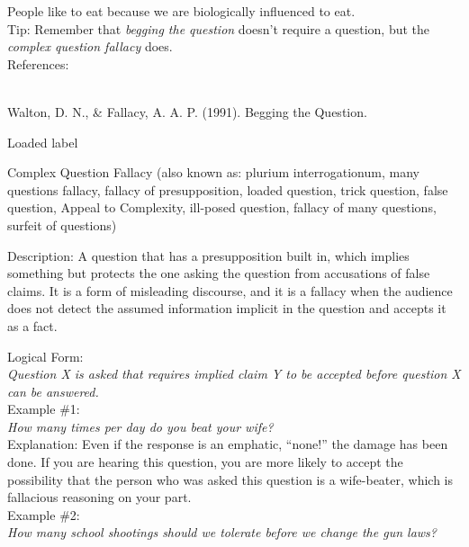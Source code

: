 \documentclass[a4paper,12pt,single,pdftex]{scrartcl}
\begin{document}
{    
      People like to eat because we are biologically influenced to eat.
    \\

    

    
      Tip: Remember that {\em begging the question} doesn’t require a question, but the {\it complex question fallacy} does.
    \\

    References:

    
      
        
      \\

      Walton, D. N., \& Fallacy, A. A. P. (1991). Begging the Question.
    
  }


Loaded label

Complex Question Fallacy
    (also known as: plurium interrogationum, many questions fallacy, fallacy of presupposition, loaded question, trick question, false question, Appeal to Complexity, ill-posed question, fallacy of many questions, surfeit of questions)
  
    Description: A question that has a presupposition built in, which implies something but protects the one asking the question from accusations of false claims.  It is a form of misleading discourse, and it is a fallacy when the audience does not detect the assumed information implicit in the question and accepts it as a fact.

    
      Logical Form:
    \\

    
      {\em Question X is asked that requires implied claim Y to be accepted before question X can be answered.}
    \\

    
      Example \#1:
    \\

    
      {\em How many times per day do you beat your wife?}
    \\

    
      Explanation: Even if the response is an emphatic, “none!” the damage has been done.  If you are hearing this question, you are more likely to accept the possibility that the person who was asked this question is a wife-beater, which is fallacious reasoning on your part.
    \\

    
      Example \#2:
    \\

    
      {\em How many school shootings should we tolerate before we change the gun laws?}
    \\
\end{document}
